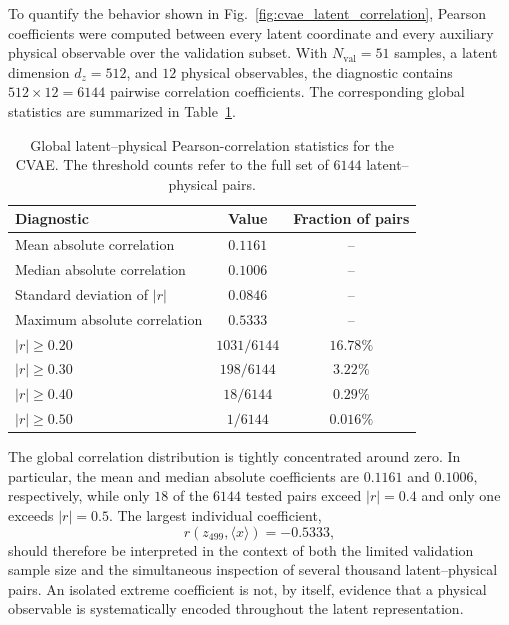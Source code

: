 To quantify the behavior shown in
Fig.~\ref{fig:cvae_latent_correlation}, Pearson coefficients were
computed between every latent coordinate and every auxiliary physical
observable over the validation subset. With $N_{\mathrm{val}}=51$
samples, a latent dimension $d_z=512$, and $12$ physical observables,
the diagnostic contains $512\times 12 = 6144$ pairwise correlation coefficients. The corresponding global statistics are summarized in Table~\ref{tab:cvae_global_correlation}.

\begin{table}[htbp]
    \centering
    \caption{
        Global latent--physical Pearson-correlation statistics for the CVAE.
        The threshold counts refer to the full set of $6144$ latent--physical
        pairs.
    }
    \label{tab:cvae_global_correlation}
    \begin{tabular}{lcc}
        \toprule
        Diagnostic & Value & Fraction of pairs \\
        \midrule
        Mean absolute correlation
            & $0.1161$ & -- \\
        Median absolute correlation
            & $0.1006$ & -- \\
        Standard deviation of $|r|$
            & $0.0846$ & -- \\
        Maximum absolute correlation
            & $0.5333$ & -- \\
        $|r|\geq 0.20$
            & $1031/6144$ & $16.78\%$ \\
        $|r|\geq 0.30$
            & $198/6144$ & $3.22\%$ \\
        $|r|\geq 0.40$
            & $18/6144$ & $0.29\%$ \\
        $|r|\geq 0.50$
            & $1/6144$ & $0.016\%$ \\
        \bottomrule
    \end{tabular}
\end{table}

The global correlation distribution is tightly concentrated around
zero. In particular, the mean and median absolute coefficients are
$0.1161$ and $0.1006$, respectively, while only $18$ of the $6144$
tested pairs exceed $|r|=0.4$ and only one exceeds $|r|=0.5$.
The largest individual coefficient,
\[
    r\!\left(z_{499},\langle x\rangle\right)=-0.5333,
\]
should therefore be interpreted in the context of both the limited
validation sample size and the simultaneous inspection of several
thousand latent--physical pairs. An isolated extreme coefficient is
not, by itself, evidence that a physical observable is systematically
encoded throughout the latent representation.

